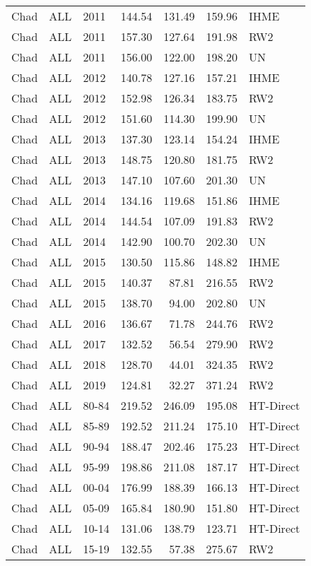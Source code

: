 \begin{longtable}{lllrrrl}
  Chad & ALL & 2011 & 144.54 & 131.49 & 159.96 & IHME \\ 
  Chad & ALL & 2011 & 157.30 & 127.64 & 191.98 & RW2 \\ 
  Chad & ALL & 2011 & 156.00 & 122.00 & 198.20 & UN \\ 
  Chad & ALL & 2012 & 140.78 & 127.16 & 157.21 & IHME \\ 
  Chad & ALL & 2012 & 152.98 & 126.34 & 183.75 & RW2 \\ 
  Chad & ALL & 2012 & 151.60 & 114.30 & 199.90 & UN \\ 
  Chad & ALL & 2013 & 137.30 & 123.14 & 154.24 & IHME \\ 
  Chad & ALL & 2013 & 148.75 & 120.80 & 181.75 & RW2 \\ 
  Chad & ALL & 2013 & 147.10 & 107.60 & 201.30 & UN \\ 
  Chad & ALL & 2014 & 134.16 & 119.68 & 151.86 & IHME \\ 
  Chad & ALL & 2014 & 144.54 & 107.09 & 191.83 & RW2 \\ 
  Chad & ALL & 2014 & 142.90 & 100.70 & 202.30 & UN \\ 
  Chad & ALL & 2015 & 130.50 & 115.86 & 148.82 & IHME \\ 
  Chad & ALL & 2015 & 140.37 & 87.81 & 216.55 & RW2 \\ 
  Chad & ALL & 2015 & 138.70 & 94.00 & 202.80 & UN \\ 
  Chad & ALL & 2016 & 136.67 & 71.78 & 244.76 & RW2 \\ 
  Chad & ALL & 2017 & 132.52 & 56.54 & 279.90 & RW2 \\ 
  Chad & ALL & 2018 & 128.70 & 44.01 & 324.35 & RW2 \\ 
  Chad & ALL & 2019 & 124.81 & 32.27 & 371.24 & RW2 \\ 
  Chad & ALL & 80-84 & 219.52 & 246.09 & 195.08 & HT-Direct \\ 
  Chad & ALL & 85-89 & 192.52 & 211.24 & 175.10 & HT-Direct \\ 
  Chad & ALL & 90-94 & 188.47 & 202.46 & 175.23 & HT-Direct \\ 
  Chad & ALL & 95-99 & 198.86 & 211.08 & 187.17 & HT-Direct \\ 
  Chad & ALL & 00-04 & 176.99 & 188.39 & 166.13 & HT-Direct \\ 
  Chad & ALL & 05-09 & 165.84 & 180.90 & 151.80 & HT-Direct \\ 
  Chad & ALL & 10-14 & 131.06 & 138.79 & 123.71 & HT-Direct \\ 
  Chad & ALL & 15-19 & 132.55 & 57.38 & 275.67 & RW2 \\ 

\end{longtable}
